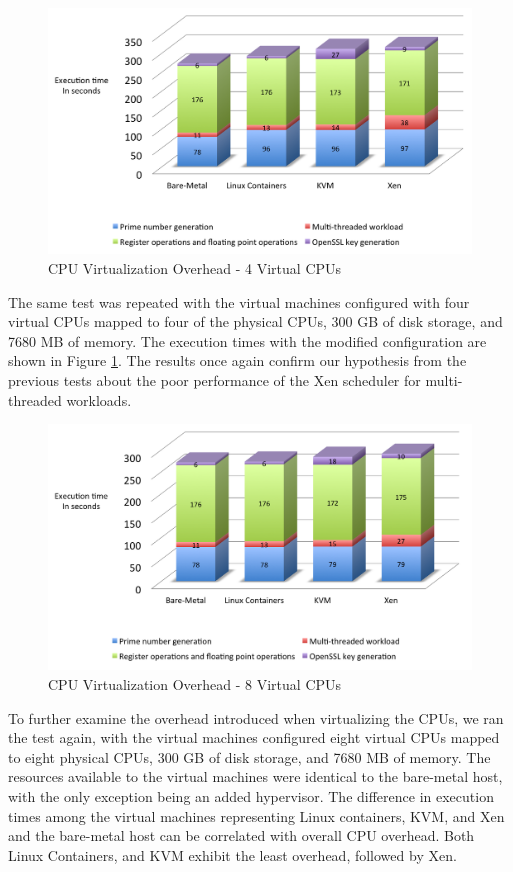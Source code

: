 \begin{figure}[h]
\centering
\includegraphics[width=130mm]{4cpu.png}
\caption{CPU Virtualization Overhead - 4 Virtual CPUs}
\label{fig:4cpu}
\end{figure}


The same test was repeated with the virtual machines configured with four virtual CPUs mapped to four of the physical CPUs, 300 GB of disk storage, and 7680 MB of memory. The execution times with the modified configuration are shown in Figure \ref{fig:4cpu}. The results once again confirm our hypothesis from the previous tests about the poor performance of the Xen scheduler for multi-threaded workloads.

\begin{figure}[H]
\centering
\includegraphics[width=130mm]{8cpu.png}
\caption{CPU Virtualization Overhead - 8 Virtual CPUs}
\label{fig:8cpu}
\end{figure}

To further examine the overhead introduced when virtualizing the CPUs, we ran the test again, with the virtual machines configured eight virtual CPUs mapped to eight physical CPUs, 300 GB of disk storage, and 7680 MB of memory. The resources available to the virtual machines were identical to the bare-metal host, with the only exception being an added hypervisor. The difference in execution times among the virtual machines representing Linux containers, KVM, and Xen and the bare-metal host can be correlated with overall CPU overhead. Both Linux Containers, and KVM exhibit the least overhead, followed by Xen.

